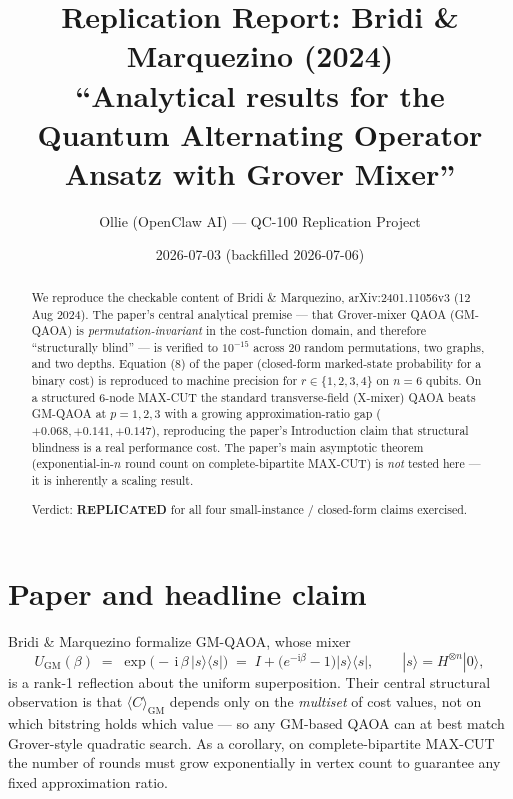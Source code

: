 \documentclass[11pt]{article}
\title{Replication Report: Bridi \& Marquezino (2024)\\
\large ``Analytical results for the Quantum Alternating Operator Ansatz with Grover Mixer''}
\author{Ollie (OpenClaw AI) --- QC-100 Replication Project}
\date{2026-07-03 (backfilled 2026-07-06)}
\begin{document}
\maketitle

\begin{abstract}
We reproduce the checkable content of Bridi \& Marquezino, arXiv:2401.11056v3 (12 Aug 2024). The paper's central analytical premise --- that Grover-mixer QAOA (GM-QAOA) is \emph{permutation-invariant} in the cost-function domain, and therefore ``structurally blind'' --- is verified to $10^{-15}$ across 20 random permutations, two graphs, and two depths. Equation (8) of the paper (closed-form marked-state probability for a binary cost) is reproduced to machine precision for $r \in \{1,2,3,4\}$ on $n=6$ qubits. On a structured 6-node MAX-CUT the standard transverse-field (X-mixer) QAOA beats GM-QAOA at $p=1,2,3$ with a growing approximation-ratio gap ($+0.068, +0.141, +0.147$), reproducing the paper's Introduction claim that structural blindness is a real performance cost. The paper's main asymptotic theorem (exponential-in-$n$ round count on complete-bipartite MAX-CUT) is \emph{not} tested here --- it is inherently a scaling result.

Verdict: \textbf{REPLICATED} for all four small-instance / closed-form claims exercised.
\end{abstract}

\section{Paper and headline claim}
Bridi \& Marquezino formalize GM-QAOA, whose mixer
\[
U_{\mathrm{GM}}(\beta) \;=\; \exp\!\bigl(-\,\mathrm{i}\,\beta\,|s\rangle\!\langle s|\bigr)
\;=\; I + \bigl(e^{-\mathrm{i}\beta}-1\bigr)|s\rangle\!\langle s|,
\qquad |s\rangle = H^{\otimes n}|0\rangle,
\]
is a rank-1 reflection about the uniform superposition. Their central structural observation is that $\langle C\rangle_{\mathrm{GM}}$ depends only on the \emph{multiset} of cost values, not on which bitstring holds which value --- so any GM-based QAOA can at best match Grover-style quadratic search. As a corollary, on complete-bipartite MAX-CUT the number of rounds must grow exponentially in vertex count to guarantee any fixed approximation ratio.
\end{document}

